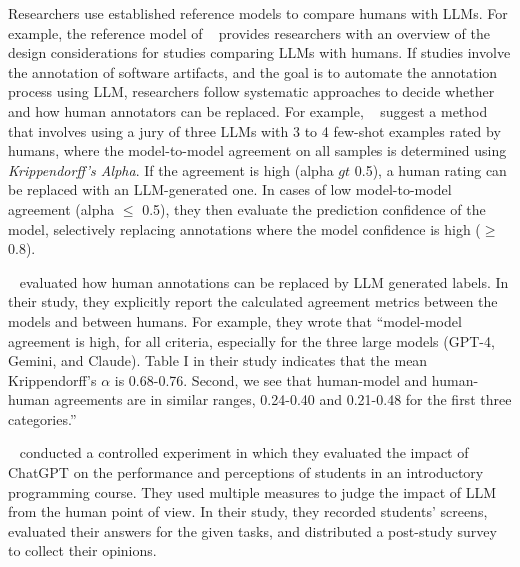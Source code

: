 Researchers \should use established reference models to compare humans with LLMs.
For example, the reference model of \citeauthor{Schneider2025ReferenceModel}~\cite{Schneider2025ReferenceModel} provides researchers with an overview of the design considerations for studies comparing LLMs with humans.
If studies involve the annotation of software artifacts, and the goal is to automate the annotation process using LLM, researchers \should follow systematic approaches to decide whether and how human annotators can be replaced.
For example, \citeauthor{DBLP:conf/msr/AhmedDTP25}~\cite{DBLP:conf/msr/AhmedDTP25} suggest a method that involves using a jury of three LLMs with 3 to 4 few-shot examples rated by humans, where the model-to-model agreement on all samples is determined using \emph{Krippendorff's Alpha}.
If the agreement is high (alpha $gt$ 0.5), a human rating can be replaced with an LLM-generated one.
In cases of low model-to-model agreement (alpha $\le$ 0.5), they then evaluate the prediction confidence of the model, selectively replacing annotations where the model confidence is high ($\ge$ 0.8).


\citeauthor{DBLP:conf/msr/AhmedDTP25}~\cite{DBLP:conf/msr/AhmedDTP25} evaluated how human annotations can be replaced by LLM generated labels.
In their study, they explicitly report the calculated agreement metrics between the models and between humans.
For example, they wrote that ``model-model agreement is high, for all criteria, especially for the three large models (GPT-4, Gemini, and Claude). Table I in their study indicates that the mean Krippendorff's $\alpha$ is 0.68-0.76.  Second, we see that human-model and human-human agreements are in similar ranges, 0.24-0.40 and 0.21-0.48 for the first three categories.''

\citeauthor{DBLP:conf/icse/XueCBTH24}~\cite{DBLP:conf/icse/XueCBTH24} conducted a controlled experiment in which they evaluated the impact of ChatGPT on the performance and perceptions of students in an introductory programming course.
They used multiple measures to judge the impact of LLM from the human point of view.
In their study, they recorded students' screens, evaluated their answers for the given tasks, and distributed a post-study survey to collect their opinions.


